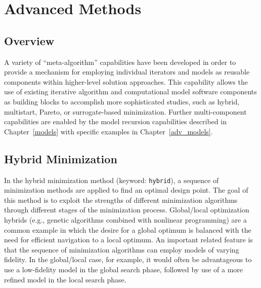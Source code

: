 \chapter{Advanced Methods}\label{adv_meth}

\section{Overview}\label{adv_meth:overview}

A variety of ``meta-algorithm'' capabilities have been developed in 
order to provide a mechanism for employing individual iterators and 
models as reusable components within higher-level solution approaches. 
This capability allows the use of existing iterative algorithm and
computational model software components as building blocks to
accomplish more sophisticated studies, such as hybrid,
multistart, Pareto, or surrogate-based minimization.  Further
multi-component capabilities are enabled by the model recursion
capabilities described in Chapter~\ref{models} with specific examples
in Chapter~\ref{adv_models}.

\section{Hybrid Minimization}\label{adv_meth:hybrid}

In the hybrid minimization method (keyword: \texttt{hybrid}), a
sequence of minimization methods are applied to find an optimal design
point. The goal of this method is to exploit the strengths of
different minimization algorithms through different stages of the
minimization process. Global/local optimization hybrids (e.g., genetic
algorithms combined with nonlinear programming) are a common example
in which the desire for a global optimum is balanced with the need for
efficient navigation to a local optimum. An important related feature
is that the sequence of minimization algorithms can employ models of
varying fidelity. In the global/local case, for example, it would
often be advantageous to use a low-fidelity model in the global search
phase, followed by use of a more refined model in the local search
phase.

